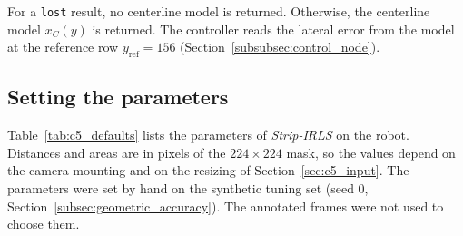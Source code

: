 For a \texttt{lost} result, no centerline model is returned. Otherwise, the centerline model $x_C(y)$ is returned. The controller reads the lateral error from the model at the reference row $y_{\mathrm{ref}}=156$ (Section~\ref{subsubsec:control_node}).

\subsection{Setting the parameters}
\label{sec:c5_parameter_setting}

Table~\ref{tab:c5_defaults} lists the parameters of \textit{Strip-IRLS} on the robot. Distances and areas are in pixels of the $224\times224$ mask, so the values depend on the camera mounting and on the resizing of Section~\ref{sec:c5_input}. The parameters were set by hand on the synthetic tuning set (seed 0, Section~\ref{subsec:geometric_accuracy}). The annotated frames were not used to choose them.

